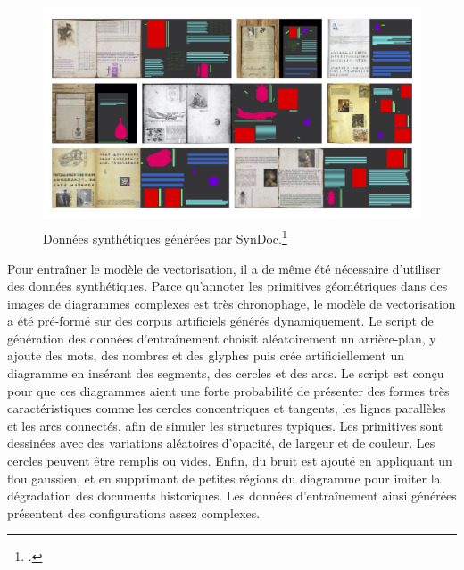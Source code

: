           \begin{figure}[H]
          \begin{center}
          \includegraphics[height=6.5cm]{figues/syndoc.jpg}
          \end{center}
          \caption{Données synthétiques générées par SynDoc.\footcite[p.46]{norindr_traitement_2023}}
          \label{fig:syndoc} \end{figure}

Pour entraîner le modèle de vectorisation, il a de même été nécessaire
d'utiliser des données synthétiques. Parce qu'annoter les primitives
géométriques dans des images de diagrammes complexes est très
chronophage, le modèle de vectorisation a été pré-formé sur des corpus
artificiels générés dynamiquement. Le script de génération des données
d'entraînement choisit aléatoirement un arrière-plan, y ajoute des mots,
des nombres et des glyphes puis crée artificiellement un diagramme en
insérant des segments, des cercles et des arcs. Le script est conçu pour
que ces diagrammes aient une forte probabilité de présenter des formes
très caractéristiques comme les cercles concentriques et tangents, les
lignes parallèles et les arcs connectés, afin de simuler les structures
typiques. Les primitives sont dessinées avec des
variations aléatoires d'opacité, de largeur et de couleur. Les cercles
peuvent être remplis ou vides. Enfin, du bruit est ajouté en appliquant
un flou gaussien, et en supprimant de petites régions du diagramme pour
imiter la dégradation des documents historiques. Les données
d'entraînement ainsi générées présentent des configurations assez
complexes.

